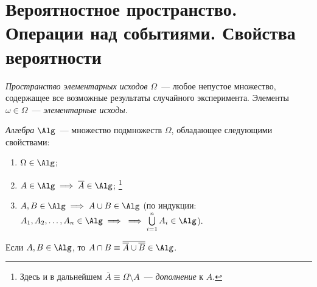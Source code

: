 \section{Вероятностное пространство. Операции над событиями. Свойства вероятности}
\begin{defn}
	\textit{Пространство элементарных исходов} $\Omega$~--- любое непустое множество, содержащее все возможные результаты случайного эксперимента.
	Элементы $\omega \in \Omega$~--- \textit{элементарные исходы}.
\end{defn}

\begin{defn}
	\textit{Алгебра} $\Alg$~--- множество подмножеств $\Omega$, обладающее следующими свойствами:
	
	\begin{enumerate}
		\item 
		      $\Omega \in \Alg$;
		\item 
		      $A \in \Alg \implies \overline{A} \in \Alg$; \footnote{Здесь и в дальнейшем $\overline{A} \equiv \Omega \setminus A$~--- \textit{дополнение} к $A$.}
		\item 
		      $A, B \in \Alg \implies A \cup B \in \Alg$ 
		      (по индукции: $A_1, A_2, \ldots, A_n \in \Alg \implies \\ \implies \bigcup\limits_{i=1}^n A_i \in \Alg$).
	\end{enumerate}
\end{defn}

\begin{rmrk}
	Если $A, B \in \Alg$, то $A \cap B \equiv \overline{\overline{A} \cup \overline{B}} \in \Alg$.
\end{rmrk}

